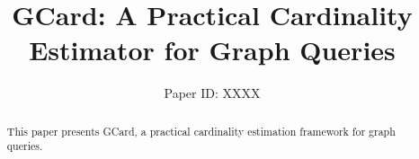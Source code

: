 \documentclass[sigconf, nonacm, pdfa]{acmart}
\begin{document}
\title{GCard: A Practical Cardinality Estimator for Graph Queries}
\fancyhead{}
\author{Paper ID: XXXX}




\begin{abstract}
This paper presents GCard, a practical cardinality estimation framework for graph queries. %


\end{abstract}
\pagestyle{plain}

\pagestyle{plain}
\maketitle













\end{document}
